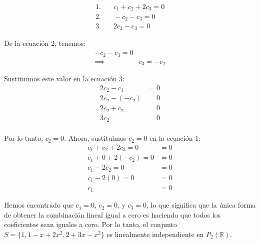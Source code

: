 \begin{itemize}
    \begin{align*}
        1. & \quad c_1 + c_2 + 2c_3 = 0 \\
        2. & \quad -c_2 - c_3 = 0 \\
        3. & \quad 2c_2 - c_3 = 0
    \end{align*}

    De la ecuación 2, tenemos:
    \begin{align*}
        -c_2 - c_3 = 0 & \\        
        \implies &  c_3 = -c_2
    \end{align*}

    Sustituimos este valor en la ecuación 3:
    \begin{align*}
        2c_2 - c_3    & = 0  \\
        2c_2 - (-c_2) & = 0  \\
        2c_2 + c_2    & = 0  \\
        3c_2          & = 0  \\
    \end{align*}


    Por lo tanto, \(c_2 = 0\). Ahora, sustituimos \(c_2 = 0\) en la ecuación 1:
    \begin{align*}
        c_1 + c_2 + 2c_3 = 0  & = 0  \\
        c_1 + 0 + 2(-c_2) = 0 & = 0  \\
        c_1 - 2c_2 = 0        & = 0  \\
        c_1 - 2(0) = 0        & = 0  \\
        c_1                   & = 0
    \end{align*}

    Hemos encontrado que \(c_1 = 0\), \(c_2 = 0\), y \(c_3 = 0\),
    lo que significa que la única forma de obtener la combinación
    lineal igual a cero es haciendo que todos los coeficientes 
    sean iguales a cero. Por lo tanto, el conjunto
     \(S = \{1, 1 - x + 2x^{2}, 2 + 3x - x^{2}\}\) 
     es linealmente independiente en \(P_{2}(\mathbb{R})\).


\end{itemize}

